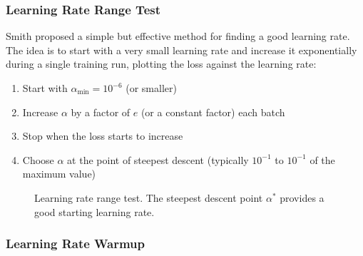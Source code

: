 \subsubsection{Learning Rate Range Test}

Smith \cite{smith2017cyclical} proposed a simple but effective method for finding a good learning rate. The idea is to start with a very small learning rate and increase it exponentially during a single training run, plotting the loss against the learning rate:

\begin{enumerate}
    \item Start with $\alpha_{\min} = 10^{-6}$ (or smaller)
    \item Increase $\alpha$ by a factor of $e$ (or a constant factor) each batch
    \item Stop when the loss starts to increase
    \item Choose $\alpha$ at the point of steepest descent (typically $10^{-1}$ to $10^{-1}$ of the maximum value)
\end{enumerate}

\begin{figure}[htbp]
    \centering
    \caption{Learning rate range test. The steepest descent point $\alpha^*$ provides a good starting learning rate.}
    \label{fig:lr_range_test}
\end{figure}

\subsubsection{Learning Rate Warmup}

